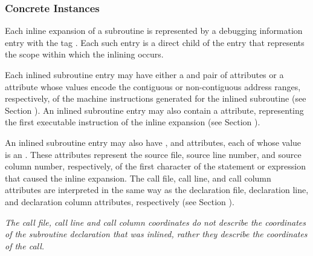 \subsubsection{Concrete Instances}
\label{chap:concreteinstances}

Each inline expansion of a subroutine is represented
by a debugging information entry with the 
tag \DWTAGinlinedsubroutineTARG. Each such entry is a direct
child of the entry that represents the scope within which
the inlining occurs.

Each inlined subroutine entry may have either a 
\DWATlowpc{}
and \DWAThighpc{} pair of attributes
or a \DWATranges{}
attribute whose values encode the contiguous or non-contiguous
address ranges, respectively, of the machine instructions
generated for the inlined subroutine (see 
Section ). 
An\hypertarget{chap:DWATentrypcentryaddressofinlinedsubprogram}{}
inlined subroutine entry may 
also 
contain 
a 
\DWATentrypc{}
attribute, representing the first executable instruction of
the inline expansion (see 
Section ).

An inlined\hypertarget{chap:DWATcalllinelinenumberofinlinedsubroutinecall}{}
subroutine\hypertarget{chap:DWATcallcolumncolumnpositionofinlinedsubroutinecall}{}
entry\hypertarget{chap:DWATcallfilefilecontaininginlinedsubroutinecall}{}
may also have \DWATcallfileDEFN,
\DWATcalllineDEFN{} and \DWATcallcolumnDEFN{} attributes,
each of whose
value is an . 
These attributes represent the
source file, source line number, and source column number,
respectively, of the first character of the statement or
expression that caused the inline expansion. The call file,
call line, and call column attributes are interpreted in
the same way as the declaration file, declaration line, and
declaration column attributes, respectively (see 
Section ).

\textit{The call file, call line and call column coordinates do not
describe the coordinates of the subroutine declaration that
was inlined, rather they describe the coordinates of the call.
}


